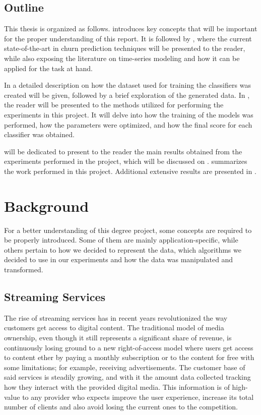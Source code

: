 \documentclass{kththesis}
\begin{document}
\section{Outline}

This thesis is organized as follows.  introduces key concepts that will be important for the proper understanding of this report. It is followed by , where the current state-of-the-art in churn prediction techniques will be presented to the reader, while also exposing the literature on time-series modeling and how it can be applied for the task at hand. 

In  a detailed description on how the dataset used for training the classifiers was created will be given, followed by a brief exploration of the generated data. In , the reader will be presented to the methods utilized for performing the experiments in this project. It will delve into how the training of the models was performed, how the parameters were optimized, and how the final score for each classifier was obtained.

 will be dedicated to present to the reader the main results obtained from the experiments performed in the project, which will be discussed on .  summarizes the work performed in this project. Additional extensive results are presented in . 

\chapter{Background}
\label{cha:background}

For a better understanding of this degree project, some concepts are required to be properly introduced. Some of them are mainly application-specific, while others pertain to how we decided to represent the data, which algorithms we decided to use in our experiments and how the data was manipulated and transformed. 

	\section{Streaming Services}
	
	The rise of streaming services has in recent years revolutionized the way customers get access to digital content. The traditional model of media ownership, even though it still represents a significant share of revenue, is continuously losing ground to a new right-of-access model where users get access to content ether by paying a monthly subscription or to the content for free with some limitations; for example, receiving advertisements. The customer base of said services is steadily growing, and with it the amount data collected tracking how they interact with the provided digital media. This information is of high-value to any provider who expects improve the user experience, increase its total number of clients and also avoid losing the current ones to the competition.
\end{document}
